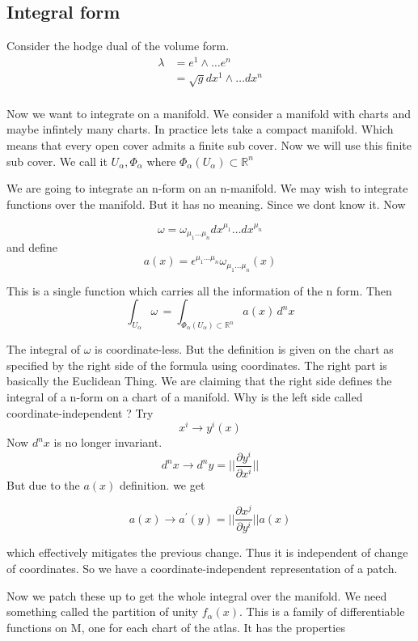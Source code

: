 \documentclass{article}
\begin{document}
\subsection{Integral form}

Consider the hodge dual of the volume form. 
\begin{align*}
\lambda &= e^1 \wedge \dots e^n  \\
&=  \sqrt{g} dx^1  \wedge \dots dx^n \\ 
\end{align*}

Now we want to integrate on a manifold. We consider a manifold with charts and maybe infintely many charts. In practice lets take a compact manifold. Which means that every open cover admits a finite sub cover. Now we will use this finite sub cover. We call it \( U_\alpha, \Phi_\alpha \) where \( \Phi_\alpha (U_\alpha) \subset \mathbb{R}^n \)

We are going to integrate an n-form on an n-manifold. We may wish to integrate functions over the manifold. But it has no meaning. Since we dont know it. Now

\[ \omega = \omega_{\mu_1 \dots \mu_n} dx^{\mu_1}\dots dx^{\mu_n} \]
and define 
\[ a(x) = \epsilon^{\mu_1 \dots \mu_n} \omega_{\mu_1 \dots \mu_n}(x) \]

This is a single function which carries all the information of the n form. Then 
\[ \int_{U_\alpha}^{} \omega \, = \int_{\Phi_\alpha(U_\alpha) \subset \mathbb{R}^n}^{} a(x)\, d^n x  \]  

The integral of \( \omega \) is coordinate-less. But the definition is given on the chart as specified by the right side of the formula using coordinates. The right part is basically the Euclidean Thing. We are claiming that the right side defines the integral of a n-form on a chart of a manifold. Why is the left side called coordinate-independent ? Try 
\[ x^i \to y^i(x) \]
Now \( d^n x \) is no longer invariant. 
\[ d^n x \to d^n y = || \frac{\partial y^i}{\partial x^i} || \]
But due to the \( a(x) \) definition. we get 

\[ a(x) \to a^{'}(y) = || \frac{\partial x^j}{\partial y^i} || a(x) \]

which effectively mitigates the previous change. Thus it is independent of change of coordinates. So we have a coordinate-independent representation of a patch. 

Now we patch these up to get the whole integral over the manifold. We need something called the partition of unity \( f_\alpha(x) \). This is a family of differentiable functions on M, one for each chart of the atlas. It has the properties 
\end{document}
